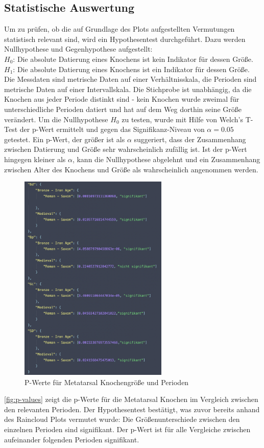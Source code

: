 \subsection{Statistische Auswertung}
Um zu prüfen, ob die auf Grundlage des Plots aufgestellten Vermutungen statistisch relevant sind, wird ein Hypothesentest durchgeführt. 
Dazu werden Nullhypothese und Gegenhypothese aufgestellt: \\
$H_0$: Die absolute Datierung eines Knochens ist kein Indikator für dessen Größe.\\
$H_1$: Die absolute Datierung eines Knochens ist ein Indikator für dessen Größe.\\

Die Messdaten sind metrische Daten auf einer Verhältnisskala, die Perioden sind metrische Daten auf einer Intervallskala. 
Die Stichprobe ist unabhängig, da die Knochen aus jeder Periode distinkt sind - kein Knochen wurde zweimal für unterschiedliche Perioden datiert und hat auf dem Weg dorthin seine Größe verändert.
Um die Nullhypothese $H_0$ zu testen, wurde mit Hilfe von Welch's T-Test der p-Wert ermittelt und gegen das Signifikanz-Niveau von $\alpha = 0.05$ getestet. 
Ein p-Wert, der größer ist als $\alpha$ suggeriert, dass der Zusammenhang zwischen Datierung und Größe sehr wahrscheinlich zufällig ist. 
Ist der p-Wert hingegen kleiner als $\alpha$, kann die Nullhypothese abgelehnt und ein Zusammenhang zwischen Alter des Knochens und Größe als wahrscheinlich angenommen werden.
\begin{figure}[H]
    \centering
    \includegraphics[height=10cm]{docs/attachments/metatarsal_p-values.png}
    \caption{P-Werte für Metatarsal Knochengröße und Perioden}
    \label{fig:p-values}
\end{figure}

\autoref{fig:p-values} zeigt die p-Werte für die Metatarsal Knochen im Vergleich zwischen den relevanten Perioden.
Der Hypothesentest bestätigt, was zuvor bereits anhand des Raincloud Plots vermutet wurde: Die Größenunterschiede zwischen den einzelnen Perioden sind signifikant.
Der p-Wert ist für alle Vergleiche zwischen aufeinander folgenden Perioden signifikant.